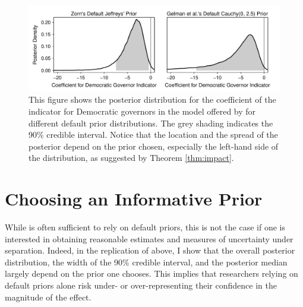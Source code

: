 \documentclass[12pt]{article}
\begin{document}
\begin{figure}[H]
\begin{center}
\includegraphics[scale = .8]{figs/br-posterior-density-illustrate-importance.pdf}
\caption{This figure shows the posterior distribution for the coefficient of the indicator for Democratic governors in the model offered by \cite{BarrilleauxRainey2014} for different default prior distributions. 
The grey shading indicates the 90\% credible interval. Notice that the location and the spread of the posterior depend on the prior chosen, especially the left-hand side of the distribution, as suggested by Theorem \ref{thm:impact}.}\label{fig:bf-posterior-density-illustrate-importance}
\end{center}
\end{figure}

\section*{Choosing an Informative Prior}

While is often sufficient to rely on default priors, this is not the case if one is interested in obtaining reasonable estimates and measures of uncertainty under separation. 
Indeed, in the replication of \cite{BarrilleauxRainey2014} above, I show that the overall posterior distribution, the width of the 90\% credible interval, and the posterior median largely depend on the prior one chooses. 
This implies that researchers relying on default priors alone risk under- or over-representing their confidence in the magnitude of the effect.
\end{document}
